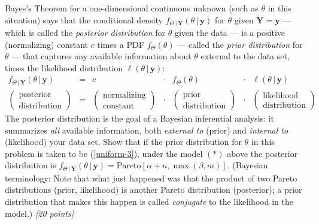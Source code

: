 \documentclass[12pt]{article}
\newcommand{\given}{\, | \,}
\begin{document}
\begin{itemize}
\begin{itemize}
Bayes's Theorem for a one-dimensional continuous unknown (such as $\theta$ in this situation) says that the conditional density $f_{ \Theta \given \bm{ Y } } ( \theta \given \bm{ y } )$ for $\theta$ given $\bm{ Y } = \bm{ y }$ --- which is called the \textit{posterior distribution} for $\theta$ given the data --- is a positive (normalizing) constant $c$ times a PDF $f_\Theta ( \theta )$ --- called the \textit{prior distribution} for $\theta$ --- that captures any available information about $\theta$ external to the data set, times the likelihood distribution $\ell ( \theta \given \bm{ y } )$:
\begin{equation} \label{uniform-4}
\begin{array}{ccccccc} f_{ \Theta \given \bm{ Y } } ( \theta \given \bm{ y } ) & = & c & \cdot & f_\Theta ( \theta ) & \cdot & \ell ( \theta \given \bm{ y } ) \\ \left( \begin{array}{c} \text{posterior} \\ \text{distribution} \end{array} \right) & = & \left( \begin{array}{c} \text{normalizing} \\ \text{constant} \end{array} \right) & \cdot & \left( \begin{array}{c} \text{prior} \\ \text{distribution} \end{array} \right) & \cdot & \left( \begin{array}{c} \text{likelihood} \\ \text{distribution} \end{array} \right) \end{array}
\end{equation}
The posterior distribution is the goal of a Bayesian inferential analysis: it summarizes \textit{all} available information, both \textit{external to} (prior) and \textit{internal to} (likelihood) your data set. Show that if the prior distribution for $\theta$ in this problem is taken to be (\ref{uniform-3}), under the model $( * )$ above the posterior
distribution is $f_{ \Theta \given \bm{ Y } } ( \theta \given \bm{ y } ) = \text{Pareto} \left[ \alpha + n, \max ( \beta, m ) \right]$. (Bayesian terminology: Note that what just happened was that the product of two Pareto distributions (prior, likelihood) is another Pareto distribution (posterior); a prior distribution that makes this happen is called \textit{conjugate} to the likelihood in the model.) \textit{[20 points]}


\end{itemize}
\end{itemize}
\end{document}
